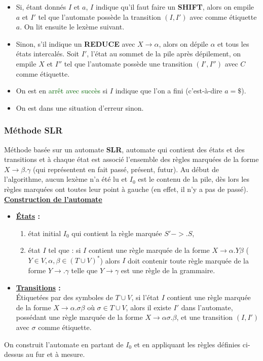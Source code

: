 \documentclass{article}
\newcommand{\gre}[1]{\textcolor{darkgreen}{#1}}
\newcommand{\stitre}[1]{\noindent\textbf{\underline{#1}}}
\begin{document}
\begin{itemize}
\item Si, étant donnés $I$ et $a$, $I$ indique qu'il faut faire un \textbf{SHIFT}, alors on empile $a$ et $I'$ tel que l'automate possède la transition $(I,I')$ avec comme 
étiquette $a$. On lit ensuite le lexème suivant.
\item Sinon, s'il indique un \textbf{REDUCE} avec $X\rightarrow \alpha$, alors on dépile $\alpha$ et tous les états intercalés. Soit $I'$, l'état au sommet de la pile après 
dépilement, on empile $X$ et $I''$ tel que l'automate possède une transition $(I',I'')$ avec $C$ comme étiquette.
\item On est en \gre{arrêt avec succès} si $I$ indique que l'on a fini (c'est-à-dire $a = \$$).
\item On est dans une situation d'erreur sinon.
\end{itemize}

\subsubsection{Méthode SLR}

Méthode basée sur un automate \textbf{SLR}, automate qui contient des états et des transitions et à chaque état est associé l'ensemble des règles marquées de la forme 
$X\rightarrow\beta .\gamma$ (qui représentent en fait passé, présent, futur). Au début de l'algorithme, aucun lexème n'a été lu et $I_0$ est le contenu de la pile, dès lors les 
règles marquées ont toutes leur point à gauche (en effet, il n'y a pas de passé). \\

\stitre{Construction de l'automate}\\

\begin{itemize}
\item \textbf{\underline{États} : }
\begin{enumerate}
\item état initial $I_0$ qui contient la règle marquée $S'->.S$,
\item état $I$ tel que : si $I$ contient une règle marquée de la forme $X\rightarrow \alpha . Y \beta$ ($Y\in V, \alpha,\beta\in (T\cup V)^*$) alors $I$ doit contenir toute 
règle marquée de la forme $Y\rightarrow .\gamma$ telle que $Y\rightarrow \gamma$ est une règle de la grammaire.
\end{enumerate}
\item \textbf{\underline{Transitions} : } \\
Étiquetées par des symboles de $T\cup V$, si l'état $I$ contient une règle marquée de la forme $X\rightarrow \alpha . \sigma \beta$ où $\sigma \in T\cup V$, alors il existe 
$I'$ dans l'automate, possédant une règle marquée de la forme $X\rightarrow \alpha \sigma . \beta$, et une transition $(I,I')$ avec $\sigma$ comme étiquette.
\end{itemize}
On construit l'automate en partant de $I_0$ et en appliquant les règles définies ci-dessus au fur et à mesure. \\
\end{document}

